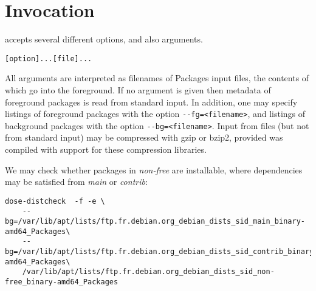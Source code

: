 
\section{Invocation}
\label{sec:invocation}

\debcheck{} accepts several different options, and also arguments.

\begin{alltt}
  \debcheck{} [option] ... [file] ...
\end{alltt}

All arguments are interpreted as filenames of Packages input files,
the contents of which go into the foreground. If no argument is given
then metadata of foreground packages is read from standard input.
In addition, one may specify listings of foreground packages with
the option \verb|--fg=<filename>|, and listings of background packages
with the option \verb|--bg=<filename>|. Input from files (but not from 
standard input) may be compressed with gzip or bzip2, provided \debcheck{}
was compiled with support for these compression libraries.

\begin{example}
We may check whether packages in \textit{non-free} are installable,
where dependencies may be satisfied from \textit{main} or \textit{contrib}:
\begin{verbatim}
dose-distcheck  -f -e \
    --bg=/var/lib/apt/lists/ftp.fr.debian.org_debian_dists_sid_main_binary-amd64_Packages\
    --bg=/var/lib/apt/lists/ftp.fr.debian.org_debian_dists_sid_contrib_binary-amd64_Packages\
    /var/lib/apt/lists/ftp.fr.debian.org_debian_dists_sid_non-free_binary-amd64_Packages
\end{verbatim}
\end{example} 

